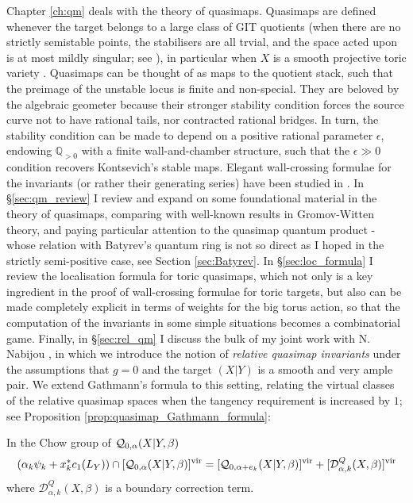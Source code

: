 Chapter \ref{ch:qm} deals with the theory of quasimaps. Quasimaps are defined whenever the target belongs to a large class of GIT quotients (when there are no strictly semistable points, the stabilisers are all trvial, and the space acted upon is at most mildly singular; see \cite{CFKM}), in particular when $X$ is a smooth projective toric variety \cite{CF-K}. Quasimaps can be thought of as maps to the quotient stack, such that the preimage of the unstable locus is finite and non-special. They are beloved by the algebraic geometer because their stronger stability condition forces the source curve not to have rational tails, nor contracted rational bridges. In turn, the stability condition can be made to depend on a positive rational parameter $\epsilon$, endowing $\mathbb Q_{>0}$ with a finite wall-and-chamber structure, such that the $\epsilon\gg0$ condition recovers Kontsevich's stable maps. Elegant wall-crossing formulae for the invariants (or rather their generating series) have been studied in \cites{TodaStableQuotient,CF-K-wallcrossing,CF-K-MirrorSymmetry,CF-K-higher-genus,CladerJandaRuan}. In \S \ref{sec:qm_review} I review and expand on some foundational material in the theory of quasimaps, comparing with well-known results in Gromov-Witten theory, and paying particular attention to the quasimap quantum product - whose relation with Batyrev's quantum ring is not so direct as I hoped in the strictly semi-positive case, see Section \ref{sec:Batyrev}. In \S \ref{sec:loc_formula} I review the localisation formula for toric quasimaps, which not only is a key ingredient in the proof of wall-crossing formulae for toric targets, but also can be made completely explicit in terms of weights for the big torus action, so that the computation of the invariants in some simple situations becomes a combinatorial game. Finally, in \S \ref{sec:rel_qm} I discuss the bulk of my joint work with N. Nabijou \cite{BN}, in which we introduce the notion of \emph{relative quasimap invariants} under the assumptions that $g=0$ and the target $(X|Y)$ is a smooth and very ample pair. We extend Gathmann's formula \cite{Ga} to this setting, relating the virtual classes of the relative quasimap spaces when the tangency requirement is increased by $1$; see Proposition \ref{prop:quasimap_Gathmann_formula}:
\begin{prop*} In the Chow group of $\mathcal{Q}_{0,\alpha}(X|Y,\beta)$
 \begin{equation*} (\alpha_k \psi_k + x_k^*c_1(L_Y)) \cap [\mathcal{Q}_{0,\alpha}(X|Y,\beta)]^{\mathrm{vir}} = [\mathcal{Q}_{0,\alpha+e_k}(X|Y,\beta)]^{\mathrm{vir}} + [\mathcal{D}^Q_{\alpha,k}(X,\beta)]^{\mathrm{vir}} \end{equation*}
where $\mathcal{D}^Q_{\alpha,k}(X,\beta)$ is a boundary correction term. \end{prop*}
